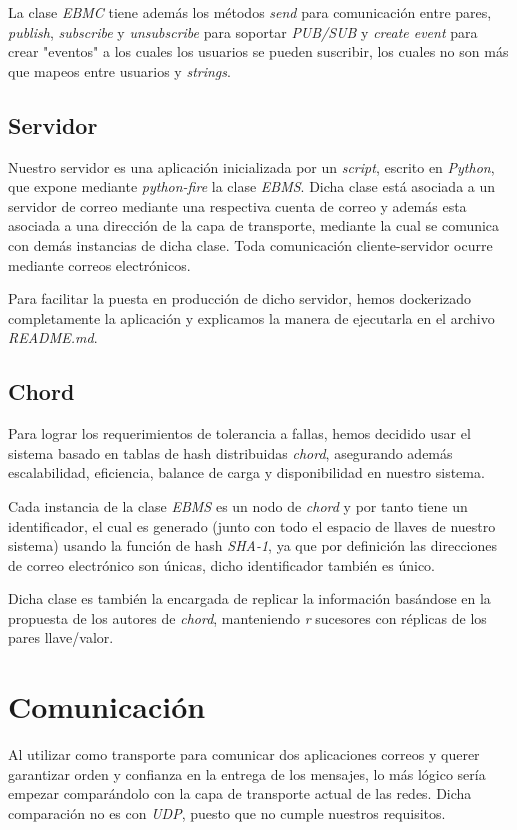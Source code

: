 \documentclass[a4paper]{article}
\begin{document}
	La clase \emph{EBMC} tiene además los métodos \emph{send} para comunicación entre pares, \emph{publish},  \emph{subscribe} y \emph{unsubscribe} para soportar \emph{PUB/SUB} y \emph{create event} para crear "eventos" a los cuales los usuarios se pueden suscribir, los cuales no son más que mapeos entre usuarios y \emph{strings}.
	
	\subsection{Servidor}\label{subsec:servidor}
	Nuestro servidor es una aplicación inicializada por un \emph{script}, escrito en \emph{Python}, que expone mediante \emph{python-fire} la clase \emph{EBMS}.
	Dicha clase está asociada a un servidor de correo mediante una respectiva cuenta de correo y además esta asociada a una dirección de la capa de transporte, mediante la cual se comunica con demás instancias de dicha clase.
	Toda comunicación cliente-servidor ocurre mediante correos electrónicos.
	
	Para facilitar la puesta en producción de dicho servidor, hemos dockerizado completamente la aplicación y explicamos la manera de ejecutarla en el archivo \emph{README.md}.
	
	
	\subsection{Chord}\label{subsec:chord}
	Para lograr los requerimientos de tolerancia a fallas, hemos decidido usar el sistema basado en tablas de hash distribuidas \emph{chord}, asegurando además escalabilidad, eficiencia, balance de carga y disponibilidad en nuestro sistema.
	
	Cada instancia de la clase \emph{EBMS} es un nodo de \emph{chord} y por tanto tiene un identificador, el cual es generado (junto con todo el espacio de llaves de nuestro sistema) usando la función de hash \emph{SHA-1}, ya que por definición las direcciones de correo electrónico son únicas, dicho identificador también es único.
	
	Dicha clase es también la encargada de replicar la información basándose en la propuesta de los autores de \emph{chord}, manteniendo \emph{r} sucesores con réplicas de los pares llave/valor.

\section{Comunicación}\label{sec:comunicación}
Al utilizar como transporte para comunicar dos aplicaciones correos y querer garantizar orden y confianza en la entrega de los mensajes, lo más lógico sería empezar comparándolo con la capa de transporte actual de las redes.
Dicha comparación no es con \emph{UDP}, puesto que no cumple nuestros requisitos.
\end{document}
